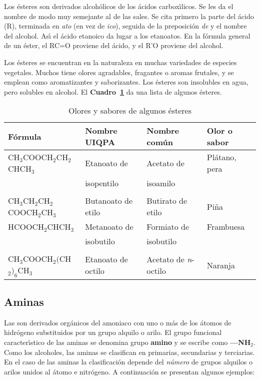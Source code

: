  Los \'esteres son derivados alcoh\'olicos de los \'acidos  carbox\'{\i}licos. Se les da el nombre de modo muy semejante al de las sales. Se cita primero la parte del \'acido (R), terminada en \textit{ato}  (en vez de \textit{ico}), seguida de la preposici\'on \textit{de} y el nombre del alcohol. As\'{\i} el \'acido etanoico da lugar a los etanoatos. En la f\'ormula general de un \'ester, el RC=O proviene del \'acido, y el R'O proviene del alcohol.

Los \'esteres se encuentran en la naturaleza en muchas variedades de especies vegetales. Muchos tiene olores agradables, fragantes o aromas frutales, y se emplean como aromatizantes y saborizantes. Los \'esteres son insolubles en agua, pero solubles en alcohol. El \textbf{Cuadro~\ref{ester}} da una lista de algunos \'esteres.
\begin{table}[hbt]
\caption{Olores y sabores de algunos \'esteres}
\label{ester}
{\small \begin{tabular}{llll}\hline
\textbf{F\'ormula} &\textbf{Nombre UIQPA}&\textbf{Nombre
com\'un}&\textbf{Olor o sabor}\\ \hline
{\scriptsize CH$_3$COOCH$_2$CH$_2$CHCH$_3$}
& Etanoato de&Acetato de &Pl\'atano, pera\\[-.05in]
\hspace{0.88in}{\scriptsize $|$}& isopentilo&isoamilo\\[-.02 in]
\hspace{.85in}{\scriptsize CH$_3$}\\
{\scriptsize CH$_3$CH$_2$CH$_2$COOCH$_2$CH$_3$} & Butanoato de etilo&
Butirato de etilo & Pi\~na\\
{\scriptsize HCOOCH$_2$CHCH$_3$ }&Metanoato de & Formiato de&
Frambuesa\\[-0.05in]
\hspace{0.5in}{\scriptsize $|$}& isobutilo& isobutilo\\[-.02in]
\hspace{0.46in}{\scriptsize CH$_3$}\\
{\scriptsize CH$_3$COOCH$_2($CH$_2)_6$CH$_3$}& Etanoato de octilo &
Acetato de
\textit{n}-octilo& Naranja\\ \hline
\end{tabular}}
\end{table}

 \subsection{Aminas}
Las \textbf{} son derivados org\'anicos del amoniaco  con uno  o m\'as de los \'atomos de hidr\'ogeno substituidos 
por un grupo alquilo o arilo. El grupo funcional caracter\'{\i}stico de las  aminas se denomina grupo \textbf{amino}  y se escribe
como \textbf{---NH$_2$}. Como los alcoholes, las aminas se clasifican en primarias, secundarias y terciarias. En el caso de las aminas la
clasificaci\'on depende del \textit{n\'umero} de grupos alquilos o arilos unidos al \'atomo e nitr\'ogeno. A continuaci\'on se presentan algunos
ejemplos:

